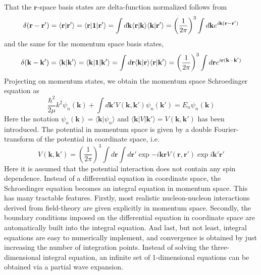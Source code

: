 \documentclass[graybox,sectrefs,envcountresetchap,open=right]{svmonodo}
\begin{document}
\noindent
That the $\mathbf{r}$-space basis states are 
delta-function normalized follows from 
\[
\delta ( \mathbf{r}-\mathbf{r'}) = \langle \mathbf{r} \vert \mathbf{r}'\rangle = \langle \mathbf{r} \vert \mathbf{1} \vert \mathbf{r}'\rangle = \int d\mathbf{k} \langle \mathbf{r}\vert \mathbf{k} \rangle \langle \mathbf{k}\vert \mathbf{r}' \rangle =\left( {1\over 2\pi}\right)^3 \int d\mathbf{k} e^{i \mathbf{k}(\mathbf{r} - \mathbf{r}')} 
\]
and the same for the momentum space basis states,
\[
\delta ( \mathbf{k}-\mathbf{k'}) = \langle \mathbf{k} \vert \mathbf{k}'\rangle = \langle \mathbf{k} \vert \mathbf{1} \vert \mathbf{k}'\rangle =\int d\mathbf{r} \langle \mathbf{k}\vert \mathbf{r} \rangle \langle \mathbf{r}\vert \mathbf{k}' \rangle = \left( {1\over 2\pi}\right)^3 \int d\mathbf{r} e^{i \mathbf{r}(\mathbf{k} - \mathbf{k}')} 
\]
Projecting  on momentum states, we obtain the momentum space Schroedinger equation as
\begin{equation}
\frac{\hbar^2}{2\mu}k^2\psi_n(\mathbf{k})+\int d\mathbf{k'}V(\mathbf{k}, \mathbf{k'}) \psi_n(\mathbf{k'})=E_n \psi_n(\mathbf{k})
\label{eq:momspace1}
\end{equation}
Here the notation $\psi_n(\mathbf{k}) =\langle\mathbf{k}\vert\psi_n\rangle $ and 
$\langle\mathbf{k}\vert V\vert\mathbf{k}' \rangle =V(\mathbf{k}, \mathbf{k'})$ has been introduced.
The potential in momentum space is given by a double Fourier-transform 
of the potential in coordinate space, i.e.
\[ 
V(\mathbf{k},\mathbf{k'}) = \left( \frac{1}{2\pi}\right)^3\int d\mathbf{r}\int d\mathbf{r}'\exp{-i\mathbf{kr}}V(\mathbf{r},\mathbf{r}')\exp{i\mathbf{k}'\mathbf{r}'}  
\]
Here it is assumed that the potential interaction does not contain any spin dependence. 
Instead of a differential equation in coordinate space, the Schroedinger
equation becomes an integral equation in momentum space. This has 
many tractable features. Firstly, most realistic 
nucleon-nucleon interactions derived from field-theory are given 
explicitly in momentum space. Secondly, the boundary conditions imposed
on the differential equation in coordinate space are automatically built into the
integral equation. And last, but not least, integral equations are easy to numerically 
implement, and convergence is obtained by just increasing the number of integration
points.
Instead of solving the three-dimensional integral equation, an 
infinite set of 1-dimensional equations can be obtained via a  partial wave
expansion. 
\end{document}
